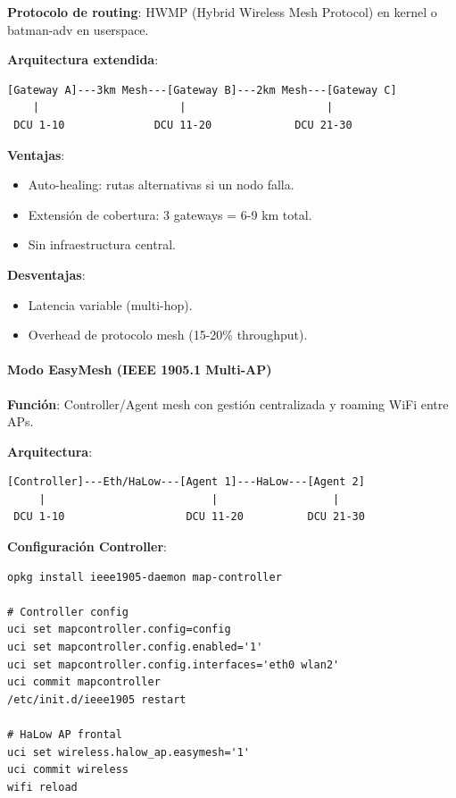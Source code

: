 \textbf{Protocolo de routing}: HWMP (Hybrid Wireless Mesh Protocol) en kernel o batman-adv en userspace.

\textbf{Arquitectura extendida}:
\begin{verbatim}
[Gateway A]---3km Mesh---[Gateway B]---2km Mesh---[Gateway C]
    |                      |                      |
 DCU 1-10              DCU 11-20             DCU 21-30
\end{verbatim}

\textbf{Ventajas}:
\begin{itemize}
    \item Auto-healing: rutas alternativas si un nodo falla.
    \item Extensión de cobertura: 3 gateways = 6-9 km total.
    \item Sin infraestructura central.
\end{itemize}

\textbf{Desventajas}:
\begin{itemize}
    \item Latencia variable (multi-hop).
    \item Overhead de protocolo mesh (15-20\% throughput).
\end{itemize}

\paragraph{Modo EasyMesh (IEEE 1905.1 Multi-AP)}

\textbf{Función}: Controller/Agent mesh con gestión centralizada y roaming WiFi entre APs.

\textbf{Arquitectura}:
\begin{verbatim}
[Controller]---Eth/HaLow---[Agent 1]---HaLow---[Agent 2]
     |                          |                  |
 DCU 1-10                   DCU 11-20          DCU 21-30
\end{verbatim}

\textbf{Configuración Controller}:
\begin{verbatim}
opkg install ieee1905-daemon map-controller

# Controller config
uci set mapcontroller.config=config
uci set mapcontroller.config.enabled='1'
uci set mapcontroller.config.interfaces='eth0 wlan2'
uci commit mapcontroller
/etc/init.d/ieee1905 restart

# HaLow AP frontal
uci set wireless.halow_ap.easymesh='1'
uci commit wireless
wifi reload
\end{verbatim}

